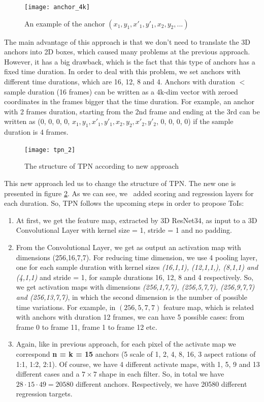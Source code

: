 \begin{figure}[h]
  \centering
  \texttt{[image: anchor\_4k]}
  \caption{An example of the anchor $(x_1,y_1,x'_1,y'_1,x_2,y_2, ...)$}
  \label{fig:anchor_4k}
\end{figure}

The main advantage of this approach is that we don't need to translate the 3D anchors into 2D boxes, which caused many problems at the previous approach.
However, it has a big drawback, which is the fact that this type of anchors has a fixed time duration.
In order to deal with this problem, we set anchors with different time durations, which are 16, 12, 8 and 4.
Anchors with duration $ < $ sample duration (16 frames) can be written as a 4k-dim vector with zeroed coordinates in the frames bigger that the time duration. For example, an anchor with
2 frames duration, starting from the 2nd frame and ending at the 3rd can be written as (0, 0, 0, 0, $x_1, y_1, x'_1, y'_1, x_2, y_2, x'_2, y'_2$, 0, 0, 0, 0) if the sample
duration is 4 frames. 

\begin{figure}[h]
  \centering
  \texttt{[image: tpn\_2]}
  \caption{The structure of TPN according to new approach}
  \label{fig:New_structure}
\end{figure}

This new approach led us to change the structure of TPN. The new one  is presented in figure \ref{fig:New_structure}. As we can see, we \
added scoring and regression layers for each duration. So, TPN follows the upcoming steps in order to propose ToIs:
\begin{enumerate}
\item At first, we get the feature map, extracted by 3D ResNet34, as input to a 3D Convolutional Layer with kernel size = 1, stride = 1 and no padding.
\item From the Convolutional Layer, we get as output an activation map with dimensions (256,16,7,7). For reducing time dimension, we use 4 pooling layer,
  one for each sample duration with kernel sizes \textit{(16,1,1), (12,1,1,), (8,1,1) and (4,1,1)} and stride = 1,  for sample durations 16, 12, 8 and 4 respectively.
  So, we get activation maps with dimensions \textit{(256,1,7,7), (256,5,7,7), (256,9,7,7) and (256,13,7,7)}, in which the second dimension is the number of possible
  time variations. For example, in $(256,5,7,7)$ feature map, which is related with anchors with duration 12 frames, we can have 5 possible cases: from frame 0 to frame
  11, frame 1 to frame 12 etc.
  
\item Again, like in previous approach, for each pixel of the activate map we correspond \textbf{n = k = 15}
  anchors (5 scale of 1, 2, 4, 8, 16, 3 aspect rations of  1:1, 1:2, 2:1). Of course, we have 4 different activate maps, with 1, 5, 9 and 13
  different cases and a $7 \times 7$ shape in each filter. So, in total we have $28 \cdot 15 \cdot 49 = 20580$ different anchors.
  Respectively, we have 20580 different regression targets.

\end{enumerate}


